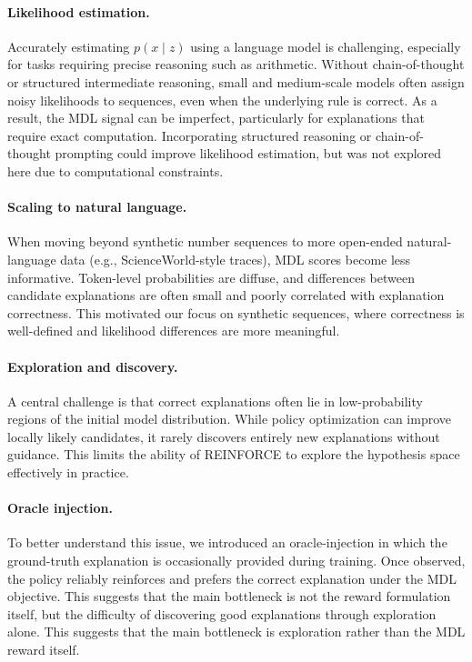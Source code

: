 \documentclass{article}
\theoremstyle{plain}
\theoremstyle{definition}
\theoremstyle{remark}
\begin{document}
\paragraph{Likelihood estimation.}
Accurately estimating $p(x \mid z)$ using a language model is challenging, especially for tasks requiring precise reasoning such as arithmetic. Without chain-of-thought or structured intermediate reasoning, small and medium-scale models often assign noisy likelihoods to sequences, even when the underlying rule is correct. As a result, the MDL signal can be imperfect, particularly for explanations that require exact computation. Incorporating structured reasoning or chain-of-thought prompting could improve likelihood estimation, but was not explored here due to computational constraints.

\paragraph{Scaling to natural language.}
When moving beyond synthetic number sequences to more open-ended natural-language data (e.g., ScienceWorld-style traces), MDL scores become less informative. Token-level probabilities are diffuse, and differences between candidate explanations are often small and poorly correlated with explanation correctness. This motivated our focus on synthetic sequences, where correctness is well-defined and likelihood differences are more meaningful.

\paragraph{Exploration and discovery.}
A central challenge is that correct explanations often lie in low-probability regions of the initial model distribution. While policy optimization can improve locally likely candidates, it rarely discovers entirely new explanations without guidance. This limits the ability of REINFORCE to explore the hypothesis space effectively in practice.

\paragraph{Oracle injection.}
To better understand this issue, we introduced an oracle-injection in which the ground-truth explanation is occasionally provided during training. Once observed, the policy reliably reinforces and prefers the correct explanation under the MDL objective. This suggests that the main bottleneck is not the reward formulation itself, but the difficulty of discovering good explanations through exploration alone. This suggests that the main bottleneck is exploration rather than the MDL reward itself.
\end{document}
